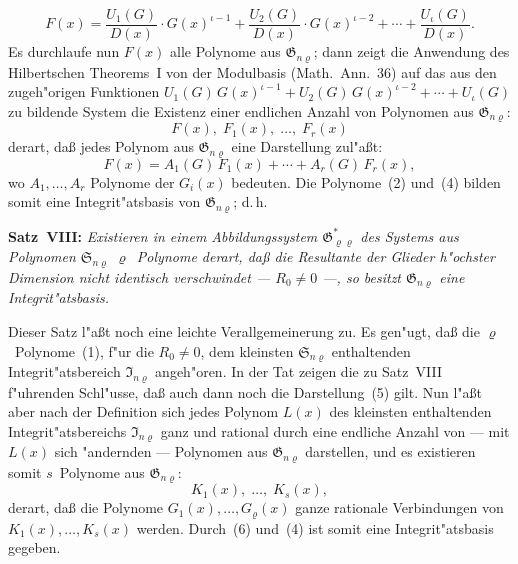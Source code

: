 \documentclass[11pt,a4paper]{article}
\begin{document}
\begin{equation}
F(x)=\frac{U_{1}(G)}{D(x)}\cdot G(x)^{\iota-1}+\frac{U_{2}(G)}{D(x)}\cdot G(x)^{\iota-2}+\cdots+\frac{U_{\iota}(G)}{D(x)}.
\tag{3}
\end{equation}
Es durchlaufe nun $F(x)$ alle Polynome aus $\mathfrak{G}_{n\varrho}$; dann zeigt die
Anwendung des Hilbertschen Theorems~I von der Modulbasis (Math.\ Ann.\ 36)
auf das aus den zugeh"{o}rigen Funktionen
$U_{1}(G)\,G(x)^{\iota-1}+U_{2}(G)\,G(x)^{\iota-2}+\cdots+U_{\iota}(G)$
zu bildende System die Existenz einer endlichen Anzahl von Polynomen
aus $\mathfrak{G}_{n\varrho}$:
\begin{equation}
F(x),\;F_{1}(x),\;\dots,\;F_{r}(x)
\tag{4}
\end{equation}
derart, da\ss{} jedes Polynom aus $\mathfrak{G}_{n\varrho}$ eine Darstellung zul"{a}\ss{}t:
\begin{equation}
F(x)=A_{1}(G)\,F_{1}(x)+\cdots+A_{r}(G)\,F_{r}(x),
\tag{5}
\end{equation}
wo $A_{1},\dots,A_{r}$ Polynome der $G_{i}(x)$ bedeuten. Die Polynome~(2)
und~(4) bilden somit eine Integrit"{a}tsbasis von $\mathfrak{G}_{n\varrho}$; d.\,h.

\medskip
\noindent
\textbf{Satz~VIII:} \emph{Existieren in einem Abbildungssystem $\mathfrak{G}_{\varrho\varrho}^{*}$
des Systems aus Polynomen $\mathfrak{S}_{n\varrho}$ $\varrho$~Polynome derart, da\ss{} die Resultante
der Glieder h"{o}chster Dimension nicht identisch verschwindet --- $R_{0}\neq 0$ ---,
so besitzt $\mathfrak{G}_{n\varrho}$ eine Integrit"{a}tsbasis.}

Dieser Satz l"{a}\ss{}t noch eine leichte Verallgemeinerung zu. Es gen"{u}gt,
da\ss{} die $\varrho$~Polynome~(1), f"{u}r die $R_{0}\neq 0$, dem kleinsten $\mathfrak{S}_{n\varrho}$
enthaltenden Integrit"{a}tsbereich $\mathfrak{I}_{n\varrho}$ angeh"{o}ren. In der Tat zeigen die zu
Satz~VIII f"{u}hrenden Schl"{u}sse, da\ss{} auch dann noch die Darstellung~(5)
gilt. Nun l"{a}\ss{}t aber nach der Definition sich jedes Polynom $L(x)$ des
kleinsten enthaltenden Integrit"{a}tsbereichs $\mathfrak{I}_{n\varrho}$ ganz und rational durch eine
endliche Anzahl von --- mit $L(x)$ sich "{a}ndernden --- Polynomen aus $\mathfrak{G}_{n\varrho}$
darstellen, und es existieren somit $s$~Polynome aus $\mathfrak{G}_{n\varrho}$:
\begin{equation}
K_{1}(x),\;\dots,\;K_{s}(x),
\tag{6}
\end{equation}
derart, da\ss{} die Polynome $G_{1}(x),\dots,G_{\varrho}(x)$ ganze rationale Verbindungen
von $K_{1}(x),\dots,K_{s}(x)$ werden. Durch~(6) und~(4) ist somit eine
Integrit"{a}tsbasis gegeben.
\end{document}
